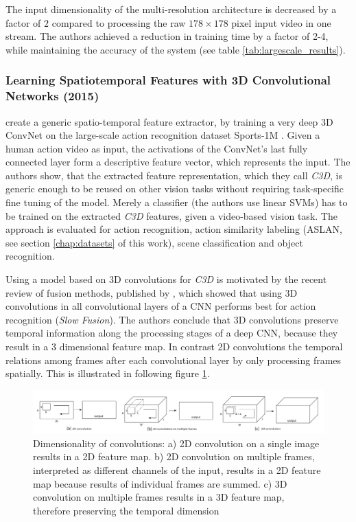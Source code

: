 The input dimensionality of the multi-resolution architecture is decreased by a factor of $2$ compared to processing the raw $178\times178$ pixel input video in one stream.
The authors achieved a reduction in training time by a factor of 2-4, while maintaining the accuracy of the system (see table \ref{tab:largescale_results}).


\subsubsection{Learning Spatiotemporal Features with 3D Convolutional Networks (2015)}
\textcite{tran_learning_2015} create a generic spatio-temporal feature extractor, by training a very deep 3D ConvNet on the large-scale action recognition dataset Sports-1M \cite{karpathy_large-scale_2014}.
Given a human action video as input, the activations of the ConvNet's last fully connected layer form a descriptive feature vector, which represents the input.
The authors show, that the extracted feature representation, which they call \textit{C3D}, is generic enough to be reused on other vision tasks without requiring task-specific fine tuning of the model.
Merely a classifier (the authors use linear SVMs) has to be trained on the extracted \textit{C3D} features, given a video-based vision task.
The approach is evaluated for action recognition, action similarity labeling (ASLAN, see section \ref{chap:datasets} of this work), scene classification and object recognition.

Using a model based on 3D convolutions for \textit{C3D} is motivated by the recent review of fusion methods, published by \textcite{karpathy_large-scale_2014}, which showed that using 3D convolutions in all convolutional layers of a CNN performs best for action recognition (\textit{Slow Fusion}).  
The authors conclude that 3D convolutions preserve temporal information along the processing stages of a deep CNN, because they result in a 3 dimensional feature map.
In contrast 2D convolutions the temporal relations among frames after each convolutional layer by only processing frames spatially.
This is illustrated in following figure \ref{fig:c3d_2dconv3dconv}.
\begin{figure}[H]
    \centering
    \includegraphics[width=\textwidth]{img_deep/c3d_2dconv3dconv}
\caption{Dimensionality of convolutions: a) 2D convolution on a single image results in a 2D feature map. b) 2D convolution on multiple frames, interpreted as different channels of the input, results in a 2D feature map because results of individual frames are summed. c) 3D convolution on multiple frames results in a 3D feature map, therefore preserving the temporal dimension \cite{karpathy_large-scale_2014}}
    \label{fig:c3d_2dconv3dconv}
\end{figure}

